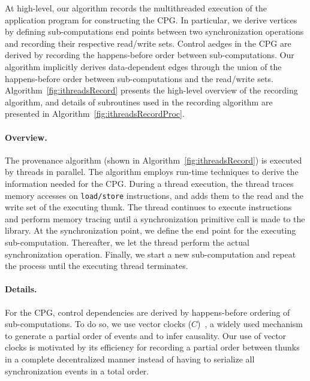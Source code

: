 At high-level, our algorithm records the multithreaded execution of the
application program for constructing the CPG.
In particular, we derive vertices  by defining
sub-computations end points between two synchronization operations and recording their respective read/write sets. Control aedges in the CPG are derived by recording the happens-before order between sub-computations. Our algorithm implicitly derives data-dependent edges through the union of the happens-before order between sub-computations and the read/write sets. Algorithm~\ref{fig:ithreadsRecord} presents the high-level
overview of the recording algorithm, and details of subroutines used in the recording algorithm are presented in Algorithm~\ref{fig:ithreadsRecordProc}.
 

\paragraph{Overview.}   The provenance algorithm (shown in Algorithm~\ref{fig:ithreadsRecord}) is executed by threads in parallel. The algorithm employs run-time techniques to derive the information needed for the CPG. During a thread execution, the thread traces memory accesses on {\tt load/store} instructions, and adds them to the read and
the write set of the executing thunk. The thread continues to execute instructions and perform memory tracing until a synchronization primitive call is made to the \pthreads  library. At the synchronization point, we define the end point for the executing sub-computation.
Thereafter, we let the thread perform the actual synchronization operation.
Finally, we start a new sub-computation and repeat the process until the executing thread
terminates.


 

\paragraph{Details.} For the CPG, control dependencies are derived by
happens-before ordering of sub-computations. To do so, we use vector clocks
($C$)~\cite{Mattern89virtualtime},  a widely used mechanism to generate a partial order of events and to infer causality. Our use of vector
clocks is motivated by its efficiency for recording a partial order between thunks in a complete decentralized manner instead of having to serialize all synchronization events in a total order.

